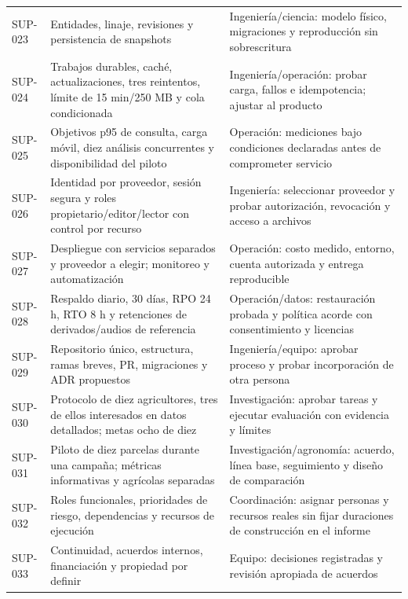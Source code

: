 \documentclass[10pt,a4paper]{article}
\begin{document}
\begin{longtable}{>{\raggedright\arraybackslash}p{2.061cm}>{\raggedright\arraybackslash}p{7.294cm}>{\raggedright\arraybackslash}p{6.501cm}}
SUP-023 & Entidades, linaje, revisiones y persistencia de snapshots & Ingeniería/\allowbreak{}ciencia: modelo físico, migraciones y reproducción sin sobrescritura \\[3pt]
SUP-024 & Trabajos durables, caché, actualizaciones, tres reintentos, límite de 15 min/\allowbreak{}250 MB y cola condicionada & Ingeniería/\allowbreak{}operación: probar carga, fallos e idempotencia; ajustar al producto \\[3pt]
SUP-025 & Objetivos p95 de consulta, carga móvil, diez análisis concurrentes y disponibilidad del piloto & Operación: mediciones bajo condiciones declaradas antes de comprometer servicio \\[3pt]
SUP-026 & Identidad por proveedor, sesión segura y roles propietario/\allowbreak{}editor/\allowbreak{}lector con control por recurso & Ingeniería: seleccionar proveedor y probar autorización, revocación y acceso a archivos \\[3pt]
SUP-027 & Despliegue con servicios separados y proveedor a elegir; monitoreo y automatización & Operación: costo medido, entorno, cuenta autorizada y entrega reproducible \\[3pt]
SUP-028 & Respaldo diario, 30 días, RPO 24 h, RTO 8 h y retenciones de derivados/\allowbreak{}audios de referencia & Operación/\allowbreak{}datos: restauración probada y política acorde con consentimiento y licencias \\[3pt]
SUP-029 & Repositorio único, estructura, ramas breves, PR, migraciones y ADR propuestos & Ingeniería/\allowbreak{}equipo: aprobar proceso y probar incorporación de otra persona \\[3pt]
SUP-030 & Protocolo de diez agricultores, tres de ellos interesados en datos detallados; metas ocho de diez & Investigación: aprobar tareas y ejecutar evaluación con evidencia y límites \\[3pt]
SUP-031 & Piloto de diez parcelas durante una campaña; métricas informativas y agrícolas separadas & Investigación/\allowbreak{}agronomía: acuerdo, línea base, seguimiento y diseño de comparación \\[3pt]
SUP-032 & Roles funcionales, prioridades de riesgo, dependencias y recursos de ejecución & Coordinación: asignar personas y recursos reales sin fijar duraciones de construcción en el informe \\[3pt]
SUP-033 & Continuidad, acuerdos internos, financiación y propiedad por definir & Equipo: decisiones registradas y revisión apropiada de acuerdos \\[3pt]

\end{longtable}
\end{document}
